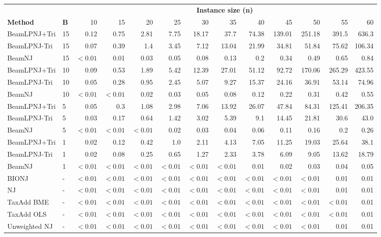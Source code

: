 \begin{tabular}{llrrrrrrrrrrr}
\toprule
&& \multicolumn{11}{c}{\textbf{Instance size (n)}} \\
\cmidrule(lr){3-13}
\textbf{Method} & \textbf{B} & 10 & 15 & 20 & 25 & 30 & 35 & 40 & 45 & 50 & 55 & 60 \\
\midrule
BeamLPNJ+Tri & 15 & 0.12 & 0.75 & 2.81 & 7.75 & 18.17 & 37.7 & 74.38 & 139.01 & 251.18 & 391.5 & 636.3 \\
BeamLPNJ-Tri & 15 & 0.07 & 0.39 & 1.4 & 3.45 & 7.12 & 13.04 & 21.99 & 34.81 & 51.84 & 75.62 & 106.34 \\
BeamNJ & 15 & $<\!0.01$ & 0.01 & 0.03 & 0.05 & 0.08 & 0.13 & 0.2 & 0.34 & 0.49 & 0.65 & 0.84 \\
BeamLPNJ+Tri & 10 & 0.09 & 0.53 & 1.89 & 5.42 & 12.39 & 27.01 & 51.12 & 92.72 & 170.06 & 265.29 & 423.55 \\
BeamLPNJ-Tri & 10 & 0.05 & 0.28 & 0.95 & 2.45 & 5.07 & 9.27 & 15.37 & 24.16 & 36.91 & 53.14 & 74.96 \\
BeamNJ & 10 & $<\!0.01$ & $<\!0.01$ & 0.02 & 0.03 & 0.05 & 0.08 & 0.12 & 0.22 & 0.31 & 0.42 & 0.55 \\
BeamLPNJ+Tri & 5 & 0.05 & 0.3 & 1.08 & 2.98 & 7.06 & 13.92 & 26.07 & 47.84 & 84.31 & 125.41 & 206.35 \\
BeamLPNJ-Tri & 5 & 0.03 & 0.17 & 0.64 & 1.42 & 3.02 & 5.39 & 9.1 & 14.45 & 21.81 & 30.6 & 43.0 \\
BeamNJ & 5 & $<\!0.01$ & $<\!0.01$ & $<\!0.01$ & 0.02 & 0.03 & 0.04 & 0.06 & 0.11 & 0.16 & 0.2 & 0.26 \\
BeamLPNJ+Tri & 1 & 0.02 & 0.12 & 0.42 & 1.0 & 2.11 & 4.13 & 7.05 & 11.25 & 19.03 & 25.64 & 38.1 \\
BeamLPNJ-Tri & 1 & 0.02 & 0.08 & 0.25 & 0.65 & 1.27 & 2.33 & 3.78 & 6.09 & 9.05 & 13.62 & 18.79 \\
BeamNJ & 1 & $<\!0.01$ & $<\!0.01$ & $<\!0.01$ & $<\!0.01$ & $<\!0.01$ & $<\!0.01$ & 0.01 & 0.02 & 0.03 & 0.04 & 0.05 \\
BIONJ & - & $<\!0.01$ & $<\!0.01$ & $<\!0.01$ & $<\!0.01$ & $<\!0.01$ & $<\!0.01$ & $<\!0.01$ & $<\!0.01$ & $<\!0.01$ & 0.01 & 0.01 \\
NJ & - & $<\!0.01$ & $<\!0.01$ & $<\!0.01$ & $<\!0.01$ & $<\!0.01$ & $<\!0.01$ & $<\!0.01$ & $<\!0.01$ & $<\!0.01$ & 0.01 & 0.01 \\
TaxAdd BME & - & $<\!0.01$ & $<\!0.01$ & $<\!0.01$ & $<\!0.01$ & $<\!0.01$ & $<\!0.01$ & $<\!0.01$ & $<\!0.01$ & $<\!0.01$ & $<\!0.01$ & 0.01 \\
TaxAdd OLS & - & $<\!0.01$ & $<\!0.01$ & $<\!0.01$ & $<\!0.01$ & $<\!0.01$ & $<\!0.01$ & $<\!0.01$ & $<\!0.01$ & $<\!0.01$ & $<\!0.01$ & 0.01 \\
Unweighted NJ & - & $<\!0.01$ & $<\!0.01$ & $<\!0.01$ & $<\!0.01$ & $<\!0.01$ & $<\!0.01$ & $<\!0.01$ & $<\!0.01$ & $<\!0.01$ & 0.01 & 0.01 \\
\bottomrule
\end{tabular}
